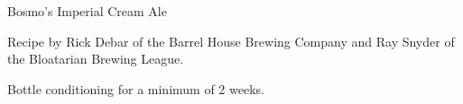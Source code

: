 \begin{recipe}{Bosmo's Imperial Cream Ale}

\begin{aboutblock}
Recipe by Rick Debar of the Barrel House Brewing Company and Ray Snyder of the
Bloatarian Brewing League.
\end{aboutblock}


\begin{methodandtiming}

\begin{mashsteps}
\end{mashsteps}

\begin{fermentationsteps}
\end{fermentationsteps}

\begin{directions}
Bottle conditioning for a minimum of 2 weeks.
\end{directions}

\end{methodandtiming}

\recipebreak

\begin{ingredientsblock}

\begin{malts}
\end{malts}

\begin{hops}
\end{hops}


\end{ingredientsblock}

\end{recipe}

